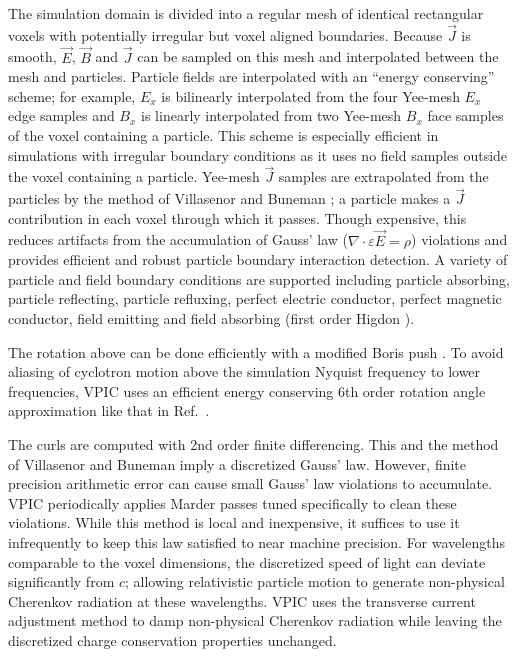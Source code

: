 \documentclass[journal,twoside]{IEEEtran}
\newcommand{\eps}{\varepsilon}
\newcommand{\vecJ}{\vec{J}}
\newcommand{\vecE}{\vec{E}}
\newcommand{\vecB}{\vec{B}}
\newcommand{\Div}[1]{\nabla \cdot #1}
\begin{document}
The simulation domain is divided into a regular mesh of identical
rectangular voxels with potentially irregular but voxel aligned
boundaries.  Because $\vecJ$ is smooth, $\vecE$, $\vecB$ and $\vecJ$
can be sampled on this mesh and interpolated between the mesh and
particles.  Particle fields are interpolated with an ``energy
conserving'' scheme; for example, $E_x$ is bilinearly interpolated
from the four Yee-mesh $E_x$ edge samples and $B_x$ is linearly
interpolated from two Yee-mesh $B_x$ face samples of the voxel
containing a particle.  This scheme is especially efficient in
simulations with irregular boundary conditions as it uses no field
samples outside the voxel containing a particle.  Yee-mesh $\vecJ$
samples are extrapolated from the particles by the method of
Villasenor and Buneman \cite{Villasenor_Buneman_1992}; a particle
makes a $\vecJ$ contribution in each voxel through which it passes.
Though expensive, this reduces artifacts from the accumulation of
Gauss' law ($\Div{\eps\vecE}=\rho$) violations and provides efficient
and robust particle boundary interaction detection.  A variety of
particle and field boundary conditions are supported including
particle absorbing, particle reflecting, particle refluxing, perfect
electric conductor, perfect magnetic conductor, field emitting and
field absorbing (first order Higdon \cite{Higdon_1986}).

The rotation above can be done efficiently with a modified Boris push
\cite{Boris_1970}.  To avoid aliasing of cyclotron motion above the
simulation Nyquist frequency to lower frequencies, VPIC uses an
efficient energy conserving 6th order rotation angle approximation
like that in Ref.~\cite{Blahovec_et_al_2000}.

The curls are computed with 2nd order finite differencing.  This and
the method of Villasenor and Buneman imply a discretized Gauss' law.
However, finite precision arithmetic error can cause small Gauss' law
violations to accumulate.  VPIC periodically applies Marder passes
\cite{Marder_1987} tuned specifically to clean these violations.
While this method is local and inexpensive, it suffices to use it
infrequently to keep this law satisfied to near machine precision.
For wavelengths comparable to the voxel dimensions, the discretized
speed of light can deviate significantly from $c$; allowing
relativistic particle motion to generate non-physical Cherenkov
radiation at these wavelengths.  VPIC uses the transverse current
adjustment method \cite{Eastwood_et_al_1995} to damp non-physical
Cherenkov radiation while leaving the discretized charge conservation
properties unchanged.
\end{document}
